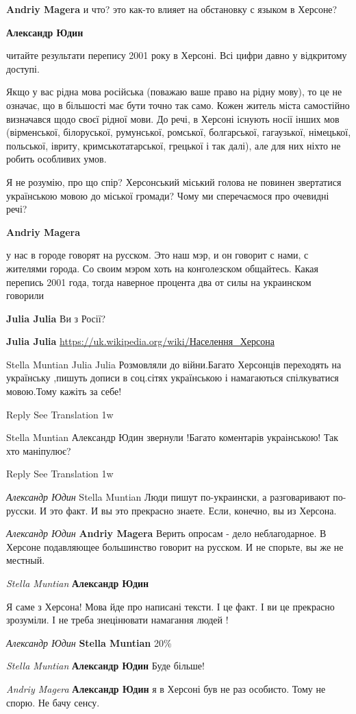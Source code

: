 \begin{itemize}
\begin{itemize}
\textbf{Andriy Magera} и что? это как-то влияет на обстановку с языком в Херсоне?

\textbf{Александр Юдин} 

читайте результати перепису 2001 року в Херсоні. Всі цифри давно у відкритому
доступі.

Якщо у вас рідна мова російська (поважаю ваше право на рідну мову), то це не
означає, що в більшості має бути точно так само. Кожен житель міста самостійно
визначався щодо своєї рідної мови. До речі, в Херсоні існують носії інших мов
(вірменської, білоруської, румунської, ромської, болгарської, гагаузької,
німецької, польської, івриту, кримськотатарської, грецької і так далі), але для
них ніхто не робить особливих умов.

Я не розумію, про що спір? Херсонський міський голова не повинен звертатися
українською мовою до міської громади? Чому ми сперечаємося про очевидні речі?

\textbf{Andriy Magera} 

у нас в городе говорят на русском. Это наш мэр, и он говорит с нами, с жителями
города. Со своим мэром хоть на конголезском общайтесь. Какая перепись 2001
года, тогда наверное процента два от силы на украинском говорили

\textbf{Julia Julia} Ви з Росії?

\textbf{Julia Julia} \url{https://uk.wikipedia.org/wiki/Населення_Херсона}

Stella Muntian
Julia Julia Розмовляли до війни.Багато Херсонців переходять на українську ,пишуть дописи в соц.сітях українською і намагаються спілкуватися мовою.Тому кажіть за себе!

    Reply
    See Translation
    1w

Stella Muntian
Александр Юдин звернули !Багато коментарів украінською! Так хто маніпулює?

    Reply
    See Translation
    1w

\emph{Александр Юдин}
Stella Muntian Люди пишут по-украински, а разговаривают по-русски. И это факт. И вы это прекрасно знаете. Если, конечно, вы из Херсона.


\emph{Александр Юдин}
\textbf{Andriy Magera} Верить опросам - дело неблагодарное. В Херсоне подавляющее большинство говорит на русском. И не спорьте, вы же не местный.

\emph{Stella Muntian}
\textbf{Александр Юдин} 

Я саме з Херсона! Мова йде про написані тексти. І це факт. І ви це прекрасно
зрозуміли. І не треба знецінювати намагання людей !

\emph{Александр Юдин}
\textbf{Stella Muntian} 20\%

\emph{Stella Muntian}
\textbf{Александр Юдин} Буде більше!💙💛

\emph{Andriy Magera}
\textbf{Александр Юдин} я в Херсоні був не раз особисто. Тому не спорю. Не бачу сенсу.

\end{itemize} %

\end{itemize} %



